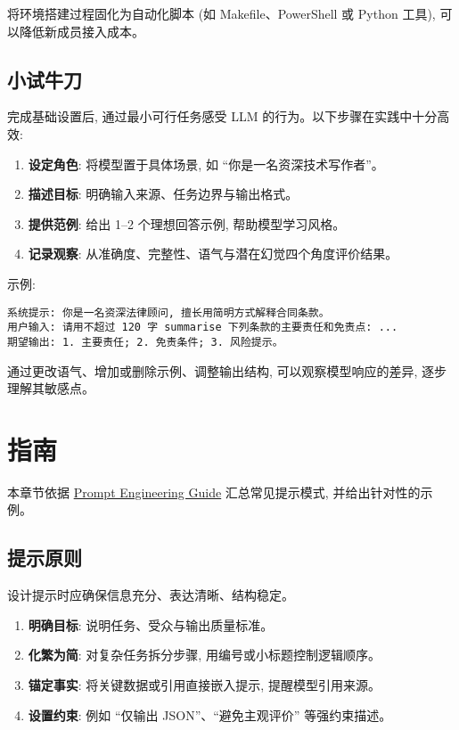 ﻿\documentclass[12pt]{ctexart}
\begin{document}
将环境搭建过程固化为自动化脚本 (如 Makefile、PowerShell 或 Python 工具), 可以降低新成员接入成本。

\subsection{小试牛刀}
完成基础设置后, 通过最小可行任务感受 LLM 的行为。以下步骤在实践中十分高效:

\begin{enumerate}[leftmargin=*,itemsep=0.5em]
  \item \textbf{设定角色}: 将模型置于具体场景, 如 ``你是一名资深技术写作者''。
  \item \textbf{描述目标}: 明确输入来源、任务边界与输出格式。
  \item \textbf{提供范例}: 给出 1--2 个理想回答示例, 帮助模型学习风格。
  \item \textbf{记录观察}: 从准确度、完整性、语气与潜在幻觉四个角度评价结果。
\end{enumerate}

示例:\par
\begin{verbatim}
系统提示: 你是一名资深法律顾问, 擅长用简明方式解释合同条款。
用户输入: 请用不超过 120 字 summarise 下列条款的主要责任和免责点: ...
期望输出: 1. 主要责任; 2. 免责条件; 3. 风险提示。
\end{verbatim}

通过更改语气、增加或删除示例、调整输出结构, 可以观察模型响应的差异, 逐步理解其敏感点。

\section{指南}
本章节依据 \href{https://prompt-engineering.xiniushu.com/}{Prompt Engineering Guide} 汇总常见提示模式, 并给出针对性的示例。

\subsection{提示原则}
设计提示时应确保信息充分、表达清晰、结构稳定。

\begin{enumerate}[leftmargin=*,itemsep=0.4em]
  \item \textbf{明确目标}: 说明任务、受众与输出质量标准。
  \item \textbf{化繁为简}: 对复杂任务拆分步骤, 用编号或小标题控制逻辑顺序。
  \item \textbf{锚定事实}: 将关键数据或引用直接嵌入提示, 提醒模型引用来源。
  \item \textbf{设置约束}: 例如 ``仅输出 JSON''、``避免主观评价'' 等强约束描述。
\end{enumerate}
\end{document}

